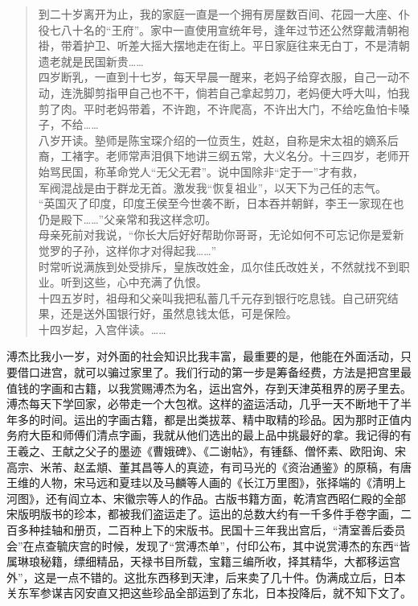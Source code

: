 \begin{quote}
	到二十岁离开为止，我的家庭一直是一个拥有房屋数百间、花园一大座、仆役七八十名的“王府”。家中一直使用宣统年号，逢年过节还公然穿戴清朝袍褂，带着护卫、听差大摇大摆地走在街上。平日家庭往来无白丁，不是清朝遗老就是民国新贵……\\

四岁断乳，一直到十七岁，每天早晨一醒来，老妈子给穿衣服，自己一动不动，连洗脚剪指甲自己也不干，倘若自己拿起剪刀，老妈便大呼大叫，怕我剪了肉。平时老妈带着，不许跑，不许爬高，不许出大门，不给吃鱼怕卡嗓子，不给……\\

八岁开读。塾师是陈宝琛介绍的一位贡生，姓赵，自称是宋太祖的嫡系后裔，工褚字。老师常声泪俱下地讲三纲五常，大义名分。十三四岁，老师开始骂民国，称革命党人“无父无君”。说中国除非“定于一”才有救，\\

军阀混战是由于群龙无首。激发我“恢复祖业”，以天下为己任的志气。\\

“英国灭了印度，印度王侯至今世袭不断，日本吞并朝鲜，李王一家现在也仍是殿下……”父亲常和我这样念叨。\\

母亲死前对我说，“你长大后好好帮助你哥哥，无论如何不可忘记你是爱新觉罗的子孙，这样你才对得起我……”\\

时常听说满族到处受排斥，皇族改姓金，瓜尔佳氏改姓关，不然就找不到职业。听到这些，心中充满了仇恨。\\

十四五岁时，祖母和父亲叫我把私蓄几千元存到银行吃息钱。自己研究结果，还是送外国银行好，虽然息钱太低，可是保险。\\

十四岁起，入宫伴读。……\\
\end{quote}

溥杰比我小一岁，对外面的社会知识比我丰富，最重要的是，他能在外面活动，只要借口进宫，就可以骗过家里了。我们行动的第一步是筹备经费，方法是把宫里最值钱的字画和古籍，以我赏赐溥杰为名，运出宫外，存到天津英租界的房子里去。溥杰每天下学回家，必带走一个大包袱。这样的盗运活动，几乎一天不断地干了半年多的时间。运出的字画古籍，都是出类拔萃、精中取精的珍品。因为那时正值内务府大臣和师傅们清点字画，我就从他们选出的最上品中挑最好的拿。我记得的有王羲之、王献之父子的墨迹《曹娥碑》、《二谢帖》，有锺繇、僧怀素、欧阳询、宋高宗、米芾、赵孟頫、董其昌等人的真迹，有司马光的《资治通鉴》的原稿，有唐王维的人物，宋马远和夏珪以及马麟等人画的《长江万里图》，张择端的《清明上河图》，还有阎立本、宋徽宗等人的作品。古版书籍方面，乾清宫西昭仁殿的全部宋版明版书的珍本，都被我们盗运走了。运出的总数大约有一千多件手卷字画，二百多种挂轴和册页，二百种上下的宋版书。民国十三年我出宫后，“清室善后委员会”在点查毓庆宫的时候，发现了“赏溥杰单”，付印公布，其中说赏溥杰的东西“皆属琳琅秘籍，缥细精品，天禄书目所载，宝籍三编所收，择其精华，大都移运宫外”，这是一点不错的。这批东西移到天津，后来卖了几十件。伪满成立后，日本关东军参谋吉冈安直又把这些珍品全部运到了东北，日本投降后，就不知下文了。\\

